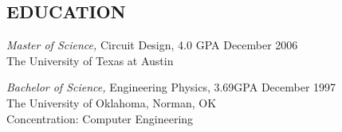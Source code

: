 \documentclass[margin]{res}
\begin{document}
\begin{resume}
\section{EDUCATION} 
{\sl Master of Science,} Circuit Design, 4.0 GPA \hfill December 2006\\
                The University of Texas at Austin                 

{\sl Bachelor of Science,} Engineering Physics, 3.69GPA \hfill December 1997\\
                The University of Oklahoma, Norman, OK\\
                Concentration: Computer Engineering\\
\end{resume}
\end{document}

